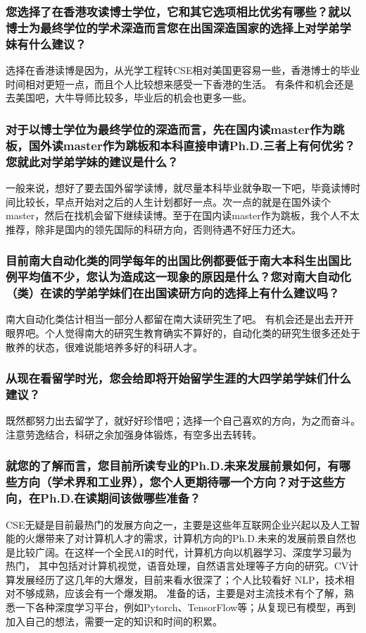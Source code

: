 \documentclass[a4paper,UTF8]{book}
\begin{document}
    \subsubsection*{您选择了在香港攻读博士学位，它和其它选项相比优劣有哪些？就以博士为最终学位的学术深造而言您在出国深造国家的选择上对学弟学妹有什么建议？}
    选择在香港读博是因为，从光学工程转CSE相对美国更容易一些，香港博士的毕业时间相对更短一点，而且个人比较想来感受一下香港的生活。
    有条件和机会还是去美国吧，大牛导师比较多，毕业后的机会也更多一些。

    \subsubsection*{对于以博士学位为最终学位的深造而言，先在国内读master作为跳板，国外读master作为跳板和本科直接申请Ph.D.三者上有何优劣？您就此对学弟学妹的建议是什么？}
    一般来说，想好了要去国外留学读博，就尽量本科毕业就争取一下吧，毕竟读博时间比较长，早点开始对之后的人生计划都好一点。次一点的就是在国外读个master，然后在找机会留下继续读博。至于在国内读master作为跳板，我个人不太推荐，除非是国内的领先国际的科研方向，否则待遇不好压力还大。

    \subsubsection*{目前南大自动化类的同学每年的出国比例都要低于南大本科生出国比例平均值不少，您认为造成这一现象的原因是什么？您对南大自动化（类）在读的学弟学妹们在出国读研方向的选择上有什么建议吗？}
    南大自动化类估计相当一部分人都留在南大读研究生了吧。
    有机会还是出去开开眼界吧。个人觉得南大的研究生教育确实不算好的，自动化类的研究生很多还处于散养的状态，很难说能培养多好的科研人才。

    \subsubsection*{从现在看留学时光，您会给即将开始留学生涯的大四学弟学妹们什么建议？}
    既然都努力出去留学了，就好好珍惜吧；选择一个自己喜欢的方向，为之而奋斗。注意劳逸结合，科研之余加强身体锻炼，有空多出去转转。

    \subsubsection*{就您的了解而言，您目前所读专业的Ph.D.未来发展前景如何，有哪些方向（学术界和工业界），您个人更期待哪一个方向？对于这些方向，在Ph.D.在读期间该做哪些准备？}
    CSE无疑是目前最热门的发展方向之一，主要是这些年互联网企业兴起以及人工智能的火爆带来了对计算机人才的需求，计算机方向的Ph.D.未来的发展前景自然也是比较广阔。在这样一个全民AI的时代，计算机方向以机器学习、深度学习最为热门， 其中包括对计算机视觉，语音处理，自然语言处理等子方向的研究。CV计算发展经历了这几年的大爆发，目前来看水很深了；个人比较看好 NLP，技术相对不够成熟，应该会有一个爆发期。
    准备的话，主要是对主流技术有个了解，熟悉一下各种深度学习平台，例如Pytorch、TensorFlow等；从复现已有模型，再到加入自己的想法，需要一定的知识和时间的积累。
    
\end{document}
